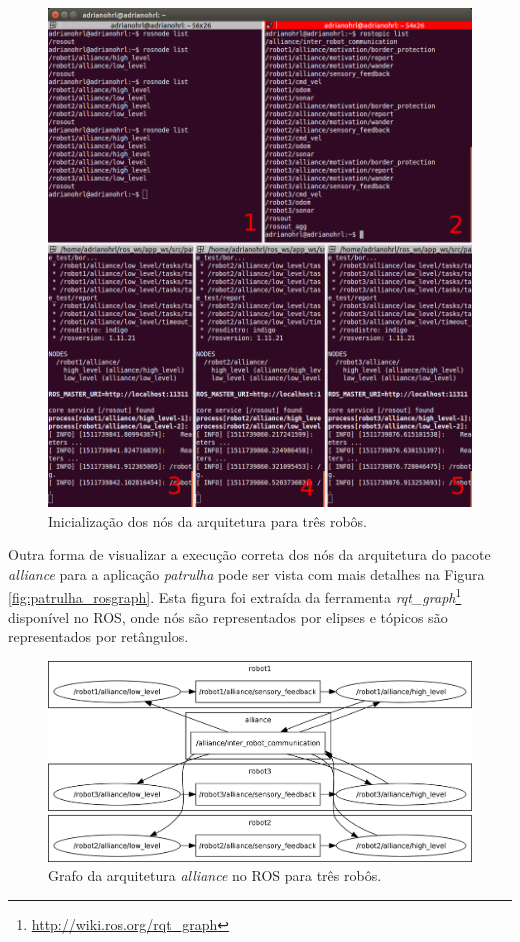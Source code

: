             \begin{figure}[htb]
                \centering
                \includegraphics[width=.97\textwidth]{Figuras/4_resultados/patrulha_launches.png}
                \caption{Inicialização dos nós da arquitetura para três robôs.} \label{fig:patrulha_launches}
            \end{figure}
            
            Outra forma de visualizar a execução correta dos nós da arquitetura do pacote \textit{alliance} para a aplicação \textit{patrulha} pode ser vista com mais detalhes na Figura \ref{fig:patrulha_rosgraph}. Esta figura foi extraída da ferramenta \textit{rqt\_graph}\footnote{\url{http://wiki.ros.org/rqt_graph}} disponível no ROS, onde nós são representados por elipses e tópicos são representados por retângulos.
        
            \begin{figure}[htb]
                \centering
                \includegraphics[width=.75\textwidth]{Figuras/4_resultados/alliance_rosgraph.png}
                \caption{Grafo da arquitetura \textit{alliance} no ROS para três robôs.} \label{fig:alliance_rosgraph}
            \end{figure}
        
